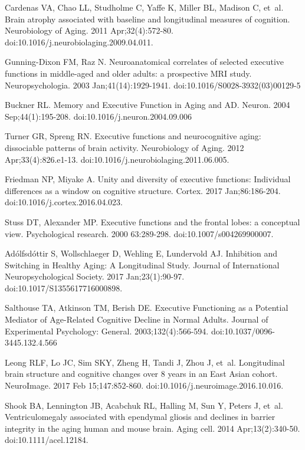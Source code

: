 \documentclass[10pt,letterpaper]{article}
\begin{document}
\begin{thebibliography}{10}
Cardenas VA, Chao LL, Studholme C, Yaffe K, Miller BL, Madison C, et~al.
\newblock Brain atrophy associated with baseline and longitudinal measures of cognition.
\newblock Neurobiology of Aging. 2011 Apr;32(4):572-80. doi:10.1016/j.neurobiolaging.2009.04.011.

Gunning-Dixon FM, Raz N.
\newblock Neuroanatomical correlates of selected executive functions in middle-aged and older adults: a prospective {MRI} study.
\newblock Neuropsychologia. 2003 Jan;41(14):1929-1941. doi:10.1016/S0028-3932(03)00129-5

Buckner RL.
\newblock Memory and Executive Function in Aging and {AD}.
\newblock Neuron. 2004 Sep;44(1):195-208. doi:10.1016/j.neuron.2004.09.006

Turner GR, Spreng RN.
\newblock Executive functions and neurocognitive aging: dissociable patterns of brain activity.
\newblock Neurobiology of Aging. 2012 Apr;33(4):826.e1-13. doi:10.1016/j.neurobiolaging.2011.06.005.

Friedman NP, Miyake A.
\newblock Unity and diversity of executive functions: Individual differences as a window on cognitive structure.
\newblock Cortex. 2017 Jan;86:186-204. doi:10.1016/j.cortex.2016.04.023.

Stuss DT, Alexander MP.
\newblock Executive functions and the frontal lobes: a conceptual view.
\newblock Psychological research. 2000 63:289-298. doi:10.1007/s004269900007.

Ad{\'o}lfsd{\'o}ttir S, Wollschlaeger D, Wehling E, Lundervold AJ.
\newblock Inhibition and Switching in Healthy Aging: A Longitudinal Study.
\newblock Journal of International Neuropsychological Society. 2017 Jan;23(1):90-97. doi:10.1017/S1355617716000898.

Salthouse TA, Atkinson TM, Berish DE.
\newblock Executive Functioning as a Potential Mediator of Age-Related Cognitive Decline in Normal Adults.
\newblock Journal of Experimental Psychology: General. 2003;132(4):566-594. doi:10.1037/0096-3445.132.4.566

Leong RLF, Lo JC, Sim SKY, Zheng H, Tandi J, Zhou J, et~al.
\newblock Longitudinal brain structure and cognitive changes over 8 years in an East Asian cohort.
\newblock NeuroImage. 2017 Feb 15;147:852-860. doi:10.1016/j.neuroimage.2016.10.016.

Shook BA, Lennington JB, Acabchuk RL, Halling M, Sun Y, Peters J, et~al.
\newblock Ventriculomegaly associated with ependymal gliosis and declines in barrier integrity in the aging human and mouse brain.
\newblock Aging cell. 2014 Apr;13(2):340-50. doi:10.1111/acel.12184.


\end{thebibliography}
\end{document}
